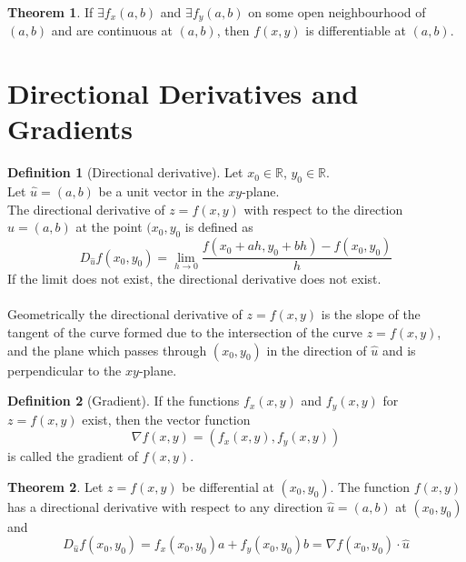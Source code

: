 \documentclass[fleqn, a4paper, 8pt, twoside]{amsart}
\theoremstyle{definition}
\theoremstyle{bluedefinition}
\newtheorem{definition}{Definition}
\theoremstyle{redtheorem}
\newtheorem{theorem}{Theorem}
\begin{document}
\begin{multicols}{2}
\begin{spacing}{0.7}
\begin{theorem}
	If $\exists f_x(a,b)$ and $\exists f_y(a,b)$ on some open neighbourhood of $(a,b)$ and are continuous at $(a,b)$, then $f(x,y)$ is differentiable at $(a,b)$.
\end{theorem}

\section{Directional Derivatives and Gradients}

\begin{definition}[Directional derivative]
	Let $x_0 \in \mathbb{R}$, $y_0 \in \mathbb{R}$.\\
	Let $\hat{u} = (a,b)$ be a unit vector in the $x y$-plane.\\
	The directional derivative of $z = f(x,y)$ with respect to the direction $\hat{u} = (a,b)$ at the point $(x_0,y_0$ is defined as
	\begin{equation*}
		D_{\hat{u}} f(x_0,y_0) = \lim\limits_{h \to 0} \frac{f(x_0 + a h, y_0 + b h) - f(x_0, y_0)}{h}
	\end{equation*}
	If the limit does not exist, the directional derivative does not exist.\\
	~\\
	Geometrically the directional derivative of $z = f(x,y)$ is the slope of the tangent of the curve formed due to the intersection of the curve $z = f(x,y)$, and the plane which passes through $(x_0,y_0)$ in the direction of $\hat{u}$ and is perpendicular to the $x y$-plane.
\end{definition}

\begin{definition}[Gradient]
	If the functions $f_x(x,y)$ and $f_y(x,y)$ for $z = f(x,y)$ exist, then the vector function
	\begin{equation*}
		\nabla f(x,y) = \left( f_x(x,y) , f_y(x,y) \right)
	\end{equation*}
	is called the gradient of $f(x,y)$.
\end{definition}

\begin{theorem}
	Let $z = f(x,y)$ be differential at $(x_0, y_0)$.
	The function $f(x,y)$ has a directional derivative with respect to any direction $\hat{u} = (a,b)$ at $(x_0, y_0)$ and
	\begin{equation*}
		D_{\hat{u}} f(x_0, y_0) = f_x(x_0, y_0) a + f_y(x_0, y_0) b = \nabla f(x_0, y_0) \cdot \hat{u}
	\end{equation*}
\end{theorem}


\end{spacing}
\end{multicols}
\end{document}
